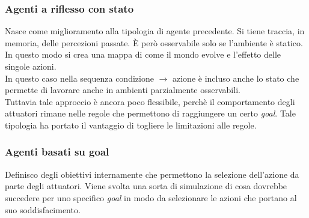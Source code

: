 \documentclass[10pt,a4paper]{book}
\begin{document}
\subsubsection{Agenti a riflesso con stato}
Nasce come miglioramento alla tipologia di agente precedente. Si tiene traccia, in memoria, delle percezioni passate. \`E per\`o osservabile solo se l'ambiente \`e statico. In questo modo si crea una mappa di come il mondo evolve e l'effetto delle singole azioni.\\
In questo caso nella sequenza condizione $\rightarrow$ azione \`e incluso anche lo stato che permette di lavorare anche in ambienti parzialmente osservabili.\\
Tuttavia tale approccio \`e ancora poco flessibile, perch\`e il comportamento degli attuatori rimane nelle regole che permettono di raggiungere un certo \textit{goal}. Tale tipologia ha portato il vantaggio di togliere le limitazioni alle regole.
\subsubsection{Agenti basati su goal}
Definisco degli obiettivi internamente che permettono la selezione dell'azione da parte degli attuatori. Viene svolta una sorta di simulazione di cosa dovrebbe succedere per uno specifico \textit{goal} in modo da selezionare le azioni che portano al suo soddisfacimento.
\end{document}
